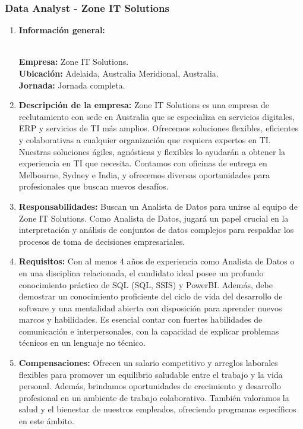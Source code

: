 \documentclass[12pt]{article}
\begin{document}
            \subsubsection{Data Analyst - Zone IT Solutions}
                \begin{enumerate}
                    \item \textbf{Información general:}
                    
                        \textbf{\\Empresa:} Zone IT Solutions.
                        \textbf{\\Ubicación:} Adelaida, Australia Meridional, Australia.
                        \textbf{\\Jornada:} Jornada completa.

                    \item \textbf{Descripción de la empresa:}
                        Zone IT Solutions es una empresa de reclutamiento con sede en Australia que se especializa en servicios digitales, ERP y servicios de TI más amplios. Ofrecemos soluciones flexibles, eficientes y colaborativas a cualquier organización que requiera expertos en TI. Nuestras soluciones ágiles, agnósticas y flexibles lo ayudarán a obtener la experiencia en TI que necesita. Contamos con oficinas de entrega en Melbourne, Sydney e India, y ofrecemos diversas oportunidades para profesionales que buscan nuevos desafíos.

                    \item \textbf{Responsabilidades:}
                        Buscan un Analista de Datos para unirse al equipo de Zone IT Solutions. Como Analista de Datos, jugará un papel crucial en la interpretación y análisis de conjuntos de datos complejos para respaldar los procesos de toma de decisiones empresariales.

                    \item \textbf{Requisitos:}
                        Con al menos 4 años de experiencia como Analista de Datos o en una disciplina relacionada, el candidato ideal posee un profundo conocimiento práctico de SQL (SQL, SSIS) y PowerBI. Además, debe demostrar un conocimiento proficiente del ciclo de vida del desarrollo de software y una mentalidad abierta con disposición para aprender nuevos marcos y habilidades. Es esencial contar con fuertes habilidades de comunicación e interpersonales, con la capacidad de explicar problemas técnicos en un lenguaje no técnico.

                    \item \textbf{Compensaciones:}
                        Ofrecen un salario competitivo y arreglos laborales flexibles para promover un equilibrio saludable entre el trabajo y la vida personal. Además, brindamos oportunidades de crecimiento y desarrollo profesional en un ambiente de trabajo colaborativo. También valoramos la salud y el bienestar de nuestros empleados, ofreciendo programas específicos en este ámbito.

                \end{enumerate}
\end{document}
